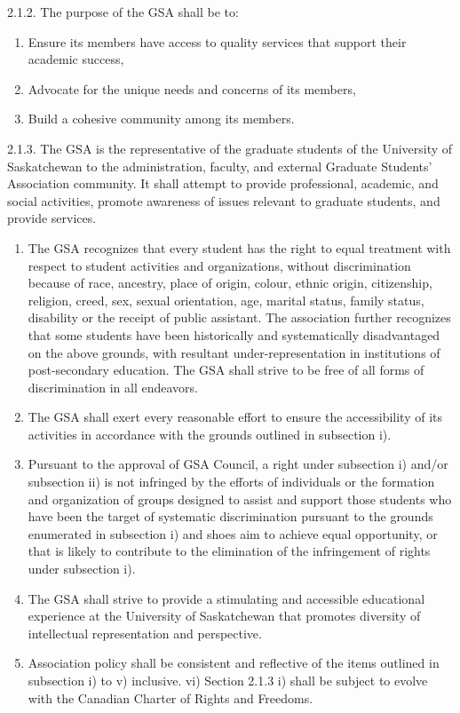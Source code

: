 2.1.2. The purpose of the GSA shall be to: 
\begin{enumerate}[i]
\item Ensure its members have access to quality services that support their academic success, 
\item Advocate for the unique needs and concerns of its members, 
\item Build a cohesive community among its members. 
\end{enumerate}

2.1.3. The GSA is the representative of the graduate students of the University of Saskatchewan to the administration, faculty, and external Graduate Students’ Association community. It shall attempt to provide professional, academic, and social activities, promote awareness of issues relevant to graduate students, and provide services. 
\begin{enumerate}[i]
\item The GSA recognizes that every student has the right to equal treatment with respect to student activities and organizations, without discrimination because of race, ancestry, place of origin, colour, ethnic origin, citizenship, religion, creed, sex, sexual orientation, age, marital status, family status, disability or the receipt of public assistant. The association further recognizes that some students have been historically and systematically disadvantaged on the above grounds, with resultant under-representation in institutions of post-secondary 
education. The GSA shall strive to be free of all forms of discrimination in all endeavors. 
\item The GSA shall exert every reasonable effort to ensure the accessibility 
of its activities in accordance with the grounds outlined in subsection i). 
\item Pursuant to the approval of GSA Council, a right under subsection i) and/or subsection ii) is not infringed by the efforts of individuals or the formation and organization of groups designed to assist and support those students who have been the target of systematic discrimination pursuant to the grounds enumerated in subsection i) and shoes aim to achieve equal opportunity, or that is likely to contribute to the elimination of the infringement of rights under subsection i). 
\item The GSA shall strive to provide a stimulating and accessible educational experience at the University of Saskatchewan that promotes diversity of intellectual representation and perspective. 
\item Association policy shall be consistent and reflective of the items outlined in subsection i) to v) inclusive. 
vi) Section 2.1.3 i) shall be subject to evolve with the Canadian Charter of 
Rights and Freedoms. 
\end{enumerate}

